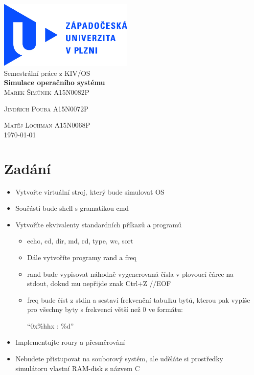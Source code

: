 \documentclass[a4paper]{article}
\begin{document}
\begin{titlepage}

\begin{center}

\author{Marek Šimůnek}

\includegraphics[width=0.5\textwidth]{./logo.jpg} \\[1cm]
 
 \huge Semestrální práce z  KIV/OS \\ [1.5cm]
\huge \textbf{ Simulace operačního systému}\\[0.9cm]
{\Large \textsc{Marek Šimůnek} } {\large \textsc{A15N0082P}  } 

{\Large \textsc{Jindřich Pouba }}{\large \textsc{A15N0072P}  } 

{\Large \textsc{Matěj Lochman }}{\large \textsc{A15N0068P}  } 
\\[0.9cm]




\large \textsc  {\today}



\end{center}


\end{titlepage}

\section{Zadání}
\begin{itemize}
\item Vytvořte virtuální stroj, který bude simulovat OS
\item Součástí bude shell s gramatikou cmd
\item Vytvoříte ekvivalenty standardních příkazů a programů
\begin{itemize}
\item echo, cd, dir, md, rd, type, wc, sort
\item Dále vytvoříte programy rand a freq
\item rand bude vypisovat náhodně vygenerovaná čísla v plovoucí čárce na stdout, dokud mu nepřijde znak Ctrl+Z //EOF
\item freq bude číst z stdin a sestaví frekvenční tabulku bytů, kterou pak vypíše pro všechny byty s frekvencí větší než 0 ve formátu: 

“0x\%hhx : \%d”
\end{itemize}


\item Implementujte roury a přesměrování
\item Nebudete přistupovat na souborový systém, ale uděláte si prostředky simulátoru vlastní RAM-disk s názvem C
\end{itemize}
\end{document}
